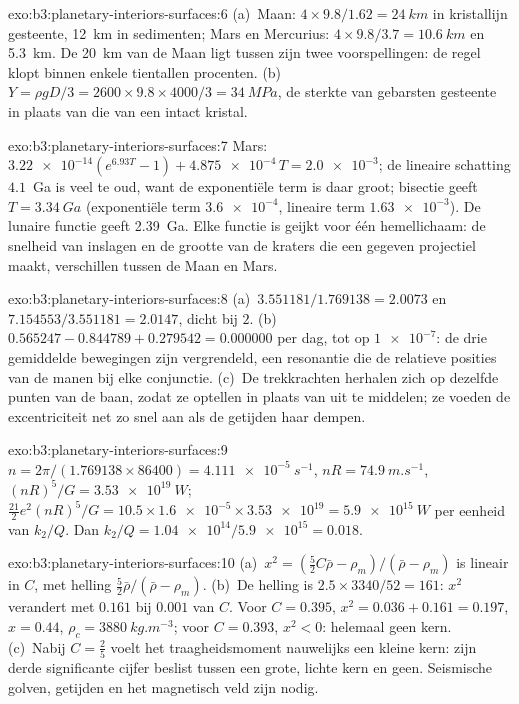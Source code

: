 \begin{solution}{exo:b3:planetary-interiors-surfaces:6}
(a)~Maan: $4\times9.8/1.62 = \qty{24}{km}$ in kristallijn gesteente,
\qty{12}{km} in sedimenten; Mars en Mercurius: $4\times9.8/3.7 =
\qty{10.6}{km}$ en \qty{5.3}{km}. De \qty{20}{km} van de Maan ligt tussen
zijn twee voorspellingen: de regel klopt binnen enkele tientallen procenten. (b)~$Y =
\rho gD/3 = 2600\times9.8\times4000/3 = \qty{34}{MPa}$, de sterkte van
gebarsten gesteente in plaats van die van een intact kristal.
\end{solution}

\begin{solution}{exo:b3:planetary-interiors-surfaces:7}
Mars: $\num{3.22e-14}(e^{6.93T} - 1) + \num{4.875e-4}\,T = \num{2.0e-3}$;
de lineaire schatting $4.1$~Ga is veel te oud, want de exponentiële term is
daar groot; bisectie geeft $T = \qty{3.34}{Ga}$ (exponentiële term
$\num{3.6e-4}$, lineaire term $\num{1.63e-3}$). De lunaire functie geeft
\qty{2.39}{Ga}. Elke functie is geijkt voor één hemellichaam: de snelheid van
inslagen en de grootte van de kraters die een gegeven projectiel maakt, verschillen
tussen de Maan en Mars.
\end{solution}

\begin{solution}{exo:b3:planetary-interiors-surfaces:8}
(a)~$3.551181/1.769138 = 2.0073$ en $7.154553/3.551181 = 2.0147$, dicht bij
$2$. (b)~$0.565247 - 0.844789 + 0.279542 = 0.000000$ per dag, tot op
$\num{1e-7}$: de drie gemiddelde bewegingen zijn vergrendeld, een resonantie die
de relatieve posities van de manen bij elke conjunctie. (c)~De trekkrachten herhalen zich op
dezelfde punten van de baan, zodat ze optellen in plaats van uit te middelen;
ze voeden de excentriciteit net zo snel aan als de getijden haar dempen.
\end{solution}

\begin{solution}{exo:b3:planetary-interiors-surfaces:9}
$n = 2\pi/(1.769138\times86400) = \qty{4.111e-5}{s^{-1}}$, $nR =
\qty{74.9}{m.s^{-1}}$, $(nR)^5/G = \qty{3.53e19}{W}$;
$\tfrac{21}{2}e^2(nR)^5/G = 10.5\times\num{1.6e-5}\times\num{3.53e19} =
\qty{5.9e15}{W}$ per eenheid van $k_2/Q$. Dan $k_2/Q =
\num{1.04e14}/\num{5.9e15} = 0.018$.
\end{solution}

\begin{solution}{exo:b3:planetary-interiors-surfaces:10}
(a)~$x^2 = (\tfrac52C\bar\rho - \rho_m)/(\bar\rho - \rho_m)$ is lineair in
$C$, met helling $\tfrac52\bar\rho/(\bar\rho - \rho_m)$. (b)~De helling is
$2.5\times3340/52 = 161$: $x^2$ verandert met $0.161$ bij $0.001$ van $C$.
Voor $C = 0.395$, $x^2 = 0.036 + 0.161 = 0.197$, $x = 0.44$, $\rho_c =
\qty{3880}{kg.m^{-3}}$; voor $C = 0.393$, $x^2 < 0$: helemaal geen kern.
(c)~Nabij $C = \tfrac25$ voelt het traagheidsmoment nauwelijks een kleine kern:
zijn derde significante cijfer beslist tussen een grote, lichte kern en geen.
Seismische golven, getijden en het magnetisch veld zijn nodig.
\end{solution}

